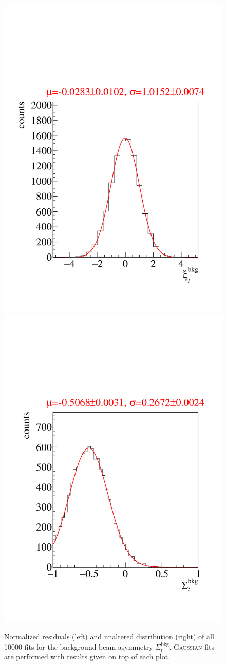 \begin{figure}[htbp]
	\centering
	\includegraphics[width=.49\linewidth]{../RooFit/plots/residuals_bkg.pdf}
	\includegraphics[width=.49\linewidth]{../RooFit/plots/sigma_bkg.pdf}
	\caption{Normalized residuals (left) and unaltered distribution (right) of all 10000 fits for the background beam asymmetry $\Sigma^\text{bkg}_t$. \textsc{Gaussian} fits are performed with results given on top of each plot.}
	\label{fig:ml_sigmat}
\end{figure}
